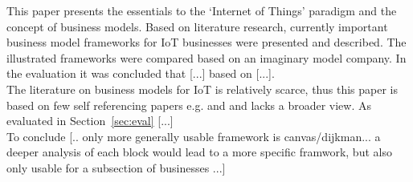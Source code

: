 	This paper presents the essentials to the `Internet of Things' paradigm and the concept of business models. Based on literature research, currently important business model frameworks for IoT businesses were presented and described. The illustrated frameworks were compared based on an imaginary model company. In the evaluation it was concluded that [...] based on [...].\\
	The literature on business models for IoT is relatively scarce, thus this paper is based on few self referencing papers e.g. \cite{ju} and \cite{dijkman} and lacks a broader view. As evaluated in Section~\ref{sec:eval} [...]\\
	To conclude [.. only more generally usable framework is canvas/dijkman... a deeper analysis of each block would lead to a more specific framwork, but also only usable for a subsection of businesses ...]

